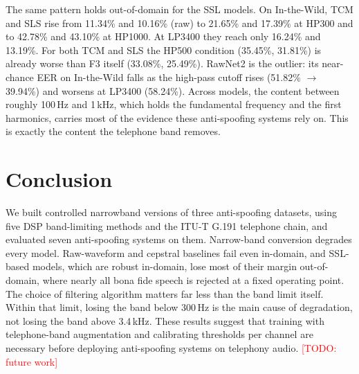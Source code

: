 \documentclass[conference]{IEEEtran}
\newcommand{\todo}[1]{\textcolor{red}{[TODO: #1]}}
\begin{document}
The same pattern holds out-of-domain for the SSL models. On In-the-Wild,
TCM and SLS rise from 11.34\% and 10.16\% (raw) to 21.65\% and 17.39\% at
HP300 and to 42.78\% and 43.10\% at HP1000. At LP3400 they reach only 16.24\%
and 13.19\%. For both TCM and SLS the HP500 condition (35.45\%, 31.81\%) is
already worse than F3 itself (33.08\%, 25.49\%). RawNet2 is the outlier: its
near-chance EER on In-the-Wild falls as the high-pass cutoff rises (51.82\%
$\rightarrow$ 39.94\%) and worsens at LP3400 (58.24\%). Across models, the
content between roughly 100\,Hz and 1\,kHz, which holds the fundamental
frequency and the first harmonics, carries most of the evidence these anti-spoofing systems
rely on. This is exactly the content the telephone band removes.

\section{Conclusion}

We built controlled narrowband versions of three anti-spoofing datasets,
using five DSP band-limiting methods and the ITU-T G.191 telephone chain,
and evaluated seven anti-spoofing systems on them. Narrow-band conversion
degrades every model. Raw-waveform and cepstral baselines fail even
in-domain, and SSL-based models, which are robust in-domain, lose most of
their margin out-of-domain, where nearly all bona fide speech is rejected
at a fixed operating point. The choice of filtering algorithm matters far
less than the band limit itself. Within that limit, losing the band below
300\,Hz is the main cause of degradation, not losing the band above
3.4\,kHz. These results suggest that training with telephone-band
augmentation and calibrating thresholds per channel are necessary before
deploying anti-spoofing systems on telephony audio. \todo{future work}



\end{document}
